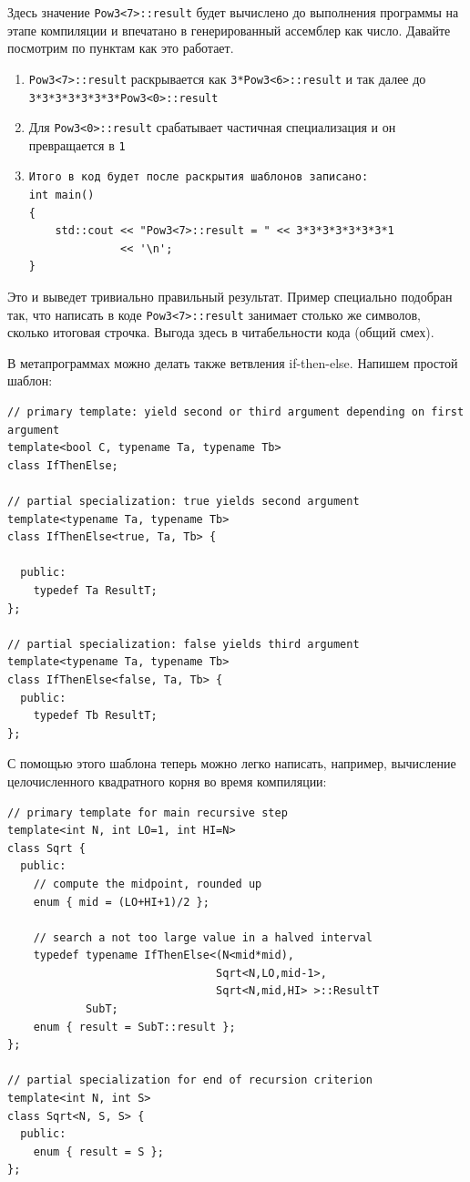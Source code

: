 \documentclass[a4paper,12pt,oneside]{article}
\begin{document}
Здесь значение \lstinline!Pow3<7>::result! будет вычислено до выполнения программы на этапе компиляции и впечатано в генерированный ассемблер как число. Давайте посмотрим по пунктам как это работает.

\begin{enumerate}
\item
\lstinline!Pow3<7>::result! раскрывается как \lstinline!3*Pow3<6>::result! и так далее до \lstinline!3*3*3*3*3*3*3*Pow3<0>::result!
\item
Для \lstinline!Pow3<0>::result! срабатывает частичная специализация и он превращается в \lstinline!1!
\item
\begin{lstlisting}
Итого в код будет после раскрытия шаблонов записано:
int main() 
{ 
    std::cout << "Pow3<7>::result = " << 3*3*3*3*3*3*3*1                                         
              << '\n'; 
} 
\end{lstlisting}
\end{enumerate}

Это и выведет тривиально правильный результат. Пример специально подобран так, что написать в коде \lstinline!Pow3<7>::result! занимает столько же символов, сколько итоговая строчка. Выгода здесь в читабельности кода (общий смех). 

В метапрограммах можно делать также ветвления if-then-else. Напишем простой шаблон:

\begin{lstlisting}
// primary template: yield second or third argument depending on first argument 
template<bool C, typename Ta, typename Tb> 
class IfThenElse; 

// partial specialization: true yields second argument 
template<typename Ta, typename Tb> 
class IfThenElse<true, Ta, Tb> { 

  public: 
    typedef Ta ResultT; 
}; 

// partial specialization: false yields third argument 
template<typename Ta, typename Tb> 
class IfThenElse<false, Ta, Tb> { 
  public: 
    typedef Tb ResultT; 
}; 
\end{lstlisting}

С помощью этого шаблона теперь можно легко написать, например, вычисление целочисленного квадратного корня во время компиляции:

\begin{lstlisting}
// primary template for main recursive step 
template<int N, int LO=1, int HI=N> 
class Sqrt { 
  public: 
    // compute the midpoint, rounded up 
    enum { mid = (LO+HI+1)/2 }; 

    // search a not too large value in a halved interval 
    typedef typename IfThenElse<(N<mid*mid), 
                                Sqrt<N,LO,mid-1>, 
                                Sqrt<N,mid,HI> >::ResultT 
            SubT; 
    enum { result = SubT::result }; 
}; 

// partial specialization for end of recursion criterion 
template<int N, int S> 
class Sqrt<N, S, S> { 
  public: 
    enum { result = S }; 
}; 
\end{lstlisting}
\end{document}
